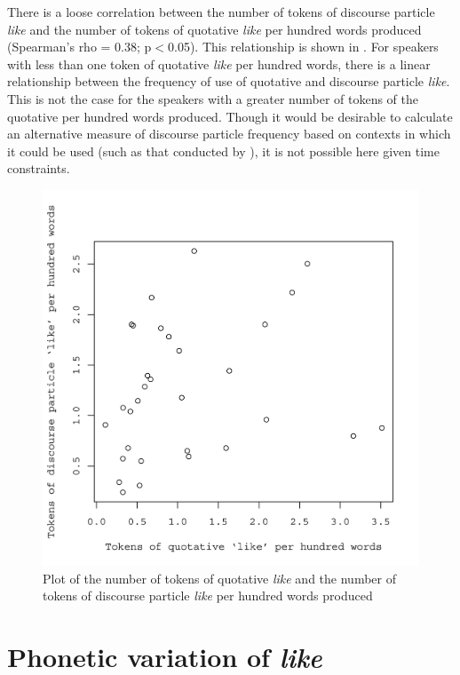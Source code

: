 \largerpage
There is a loose correlation between the number of tokens of discourse particle \textit{like} and the number of tokens of quotative \textit{like} per hundred words produced (Spearman's rho = 0.38; p$<$0.05). This relationship is shown in . For speakers with less than one token of quotative \textit{like} per hundred words, there is a linear relationship between the frequency of use of quotative and discourse particle \textit{like}. This is not the case for the speakers with a greater number of tokens of the quotative per hundred words produced. Though it would be desirable to calculate an alternative measure of discourse particle frequency based on contexts in which it could be used (such as that conducted by \citealt{darcy2005}), it is not possible here given time constraints. 

\clearpage
\begin{figure} 
	\centering
		\includegraphics[height=.5\textheight]{images/freofuseCompare.jpg}
	\caption{Plot of the number of tokens of quotative \textit{like} and the number of tokens of discourse particle \textit{like} per hundred words produced}
	\label{fig:ComparingQDP}
\end{figure}



\section{Phonetic variation of \textit{like}}\label{sec:phoneticlike}

